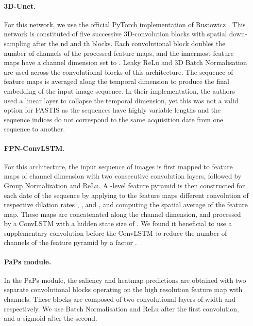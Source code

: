 \paragraph{3D-Unet.} 
For this network, we use the official PyTorch implementation of Rustowicz \etal \cite{m2019semantic}. This network is constituted of 
five successive 3D-convolution blocks with spatial down-sampling after the nd and th blocks. Each convolutional block doubles the number of channels of the processed feature maps, and the innermost feature maps have a channel dimension set to . Leaky ReLu and 3D Batch Normalisation are used across the convolutional blocks of this architecture. The sequence of feature maps is averaged along the temporal dimension to produce the final embedding of the input image sequence. In their implementation, the authors used a linear layer to collapse the temporal dimension, yet this was not a valid option for PASTIS as the sequences have highly variable lengths and
the sequence indices do not correspond to the same acquisition date from one sequence to another.


\paragraph{FPN-ConvLSTM.} 
For this architecture, the input sequence of images is first mapped to feature maps of channel dimension  with two consecutive  convolution layers, followed by Group Normalization and ReLu. A -level feature pyramid is then constructed for each date of the sequence
by applying to the feature maps  different  convolution of respective dilation rates , ,  and , and computing the spatial average of the feature map.
These  maps are concatenated along the channel dimension, and processed by a ConvLSTM with a hidden state size of . We found it beneficial to use a supplementary convolution before the ConvLSTM to reduce the number of channels of the feature pyramid by a factor .



\paragraph{PaPs module.} In the PaPs module, the saliency and heatmap predictions are obtained with two separate convolutional blocks operating on the high resolution feature map  with  channels. These blocks are composed of two convolutional layers
of width  and   respectively. We use Batch Normalisation and ReLu after the first convolution, and a sigmoid after the second.


